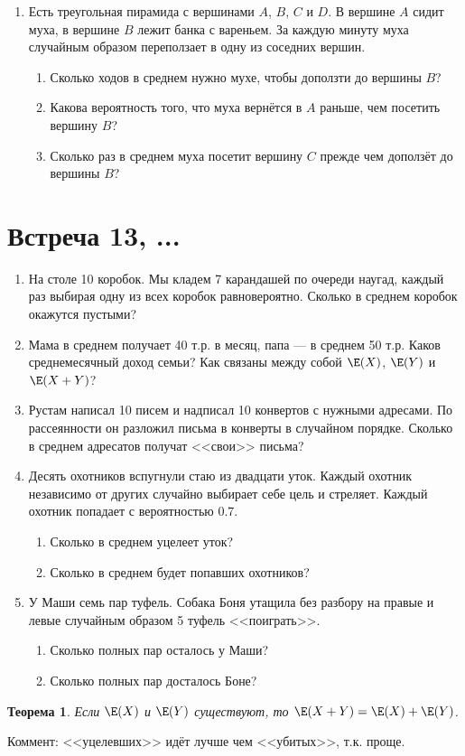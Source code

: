 \documentclass[pdftex,12pt,a4paper]{article}
\newtheorem*{theorem}{Теорема}
\begin{document}
\begin{enumerate}
\item Есть треугольная пирамида с вершинами $A$, $B$, $C$ и $D$. В вершине $A$ сидит муха, в вершине $B$ лежит банка с вареньем. За каждую минуту муха случайным образом переползает в одну из соседних вершин.
\begin{enumerate}
\item Сколько ходов в среднем нужно мухе, чтобы доползти до вершины $B$?
\item Какова вероятность того, что муха вернётся в $A$ раньше, чем посетить вершину $B$?
\item Сколько раз в среднем муха посетит вершину $C$ прежде чем доползёт до вершины $B$?
\end{enumerate}
\end{enumerate}

\newpage
\section{Встреча 13, ...}


\begin{enumerate}

\item На столе 10 коробок. Мы кладем 7 карандашей по очереди наугад, каждый раз выбирая одну из всех коробок равновероятно. Сколько в среднем коробок окажутся пустыми?

\item Мама в среднем получает 40 т.р. в месяц, папа --- в среднем 50 т.р. Каков среднемесячный доход семьи? Как связаны между собой $\E(X)$, $\E(Y)$ и $\E(X+Y)$?


\item Рустам написал 10 писем и надписал 10 конвертов с нужными адресами. По рассеянности он разложил письма в конверты в случайном порядке. Сколько в среднем адресатов получат <<свои>> письма?

\item Десять охотников вспугнули стаю из двадцати уток. Каждый охотник независимо от других случайно выбирает себе цель и стреляет. Каждый охотник попадает с вероятностью $0.7$.
\begin{enumerate}
\item Сколько в среднем уцелеет уток?
\item Сколько в среднем будет попавших охотников?
\end{enumerate}


\item У Маши семь пар туфель. Собака Боня утащила без разбору на правые и левые случайным образом 5 туфель <<поиграть>>. 
\begin{enumerate}
\item Сколько полных пар осталось у Маши?
\item Сколько полных пар досталось Боне?
\end{enumerate}


\end{enumerate}


\begin{theorem} 
Если $\E(X)$ и $\E(Y)$ существуют, то $\E(X+Y)=\E(X)+\E(Y)$.
\end{theorem}



Коммент: <<уцелевших>> идёт лучше чем <<убитых>>, т.к. проще.
\end{document}
